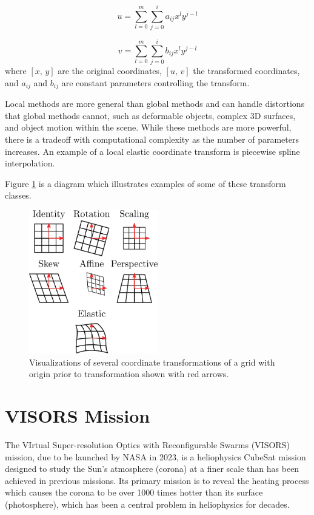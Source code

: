 \documentclass[tocnosub,noragright,centerchapter,12pt]{uiucecethesis09}
\begin{document}
$$u = \sum_{l=0}^m \sum_{j=0}^i a_{ij} x^l y^{j - l}$$

$$v = \sum_{l=0}^m \sum_{j=0}^i b_{ij} x^l y^{j - l}$$
where $[x,\,y]$ are the original coordinates, $[u,\,v]$ the transformed coordinates, and $a_{ij}$ and $b_{ij}$ are constant parameters controlling the transform.

Local methods are more general than global methods and can handle distortions that global methods cannot, such as deformable objects, complex 3D surfaces, and object motion within the scene.  While these methods are more powerful, there is a tradeoff with computational complexity as the number of parameters increases.  An example of a local elastic coordinate transform is piecewise spline interpolation.

Figure \ref{fig:classes} is a diagram which illustrates examples of some of these transform classes.

\begin{figure}
  \centering
  \includegraphics[width=0.5\textwidth]{figures/transforms.png}
  \caption{Visualizations of several coordinate transformations of a grid with origin prior to transformation shown with red arrows.}
  \label{fig:classes}
\end{figure}

\section{VISORS Mission}

The VIrtual Super-resolution Optics with Reconfigurable Swarms (VISORS) mission, due to be launched by NASA in 2023, is a heliophysics CubeSat mission designed to study the Sun's atmosphere (corona) at a finer scale than has been achieved in previous missions.  Its primary mission is to reveal the heating process which causes the corona to be over 1000 times hotter than its surface (photosphere), which has been a central problem in heliophysics for decades.
\end{document}
